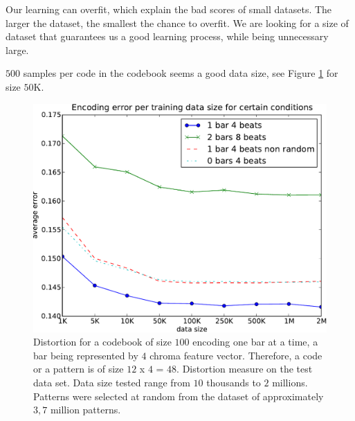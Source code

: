 \documentclass{article}
\begin{document}
Our learning can overfit, which explain the bad scores of small datasets.
The larger the dataset, the smallest the chance to overfit.
We are looking for a size of dataset that guarantees us a good learning
process, while being unnecessary large.

$500$ samples per code in the codebook seems a good data size, see
Figure \ref{fig:sizes} for size $50$K.

\begin{figure}[htb]
\begin{center}
\includegraphics[width=.99\columnwidth]{data_sizes}
\end{center}
\caption{{Distortion for a codebook of size $100$ encoding one bar
at a time, a bar being represented by $4$ chroma feature vector.
Therefore, a code or a pattern is of size $12$ x $4$ = $48$.
Distortion measure on the test data set. Data size tested range
from $10$ thousands to $2$ millions. Patterns were selected at
random from the dataset of approximately $3,7$ million patterns.}}
\label{fig:sizes}
\end{figure}
\end{document}
